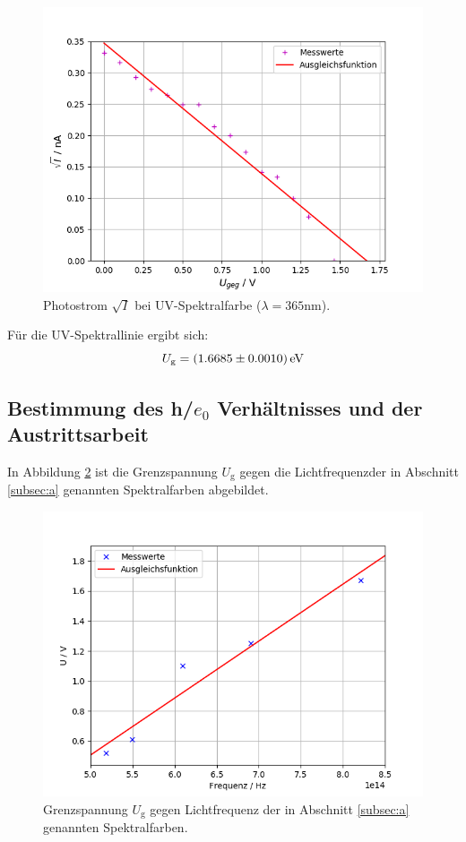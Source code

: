 \documentclass[
  bibliography=totoc,     %
  captions=tableheading,  %
  titlepage=firstiscover, %
]{scrartcl}
\begin{document}
\begin{figure}[H]
    \centering
    \includegraphics[scale=0.7]{Auswertung/aUv.png}
    \caption{Photostrom $\sqrt{I}$ bei UV-Spektralfarbe ($\lambda = 365 \text{nm}$).}
    \label{fig:UV}
\end{figure}
Für die UV-Spektrallinie ergibt sich:
\begin{equation*}
	U_\text{g} = \SI{1.6685 \pm 0.0010}{\eV}
\end{equation*}

\subsection{Bestimmung des h/$e_0$ Verhältnisses und der Austrittsarbeit}
In Abbildung \ref{fig:bPlot} ist die Grenzspannung $U_\text{g}$ gegen die Lichtfrequenz\nu der in Abschnitt \ref{subsec:a} genannten Spektralfarben abgebildet.

\begin{figure}[H]
    \centering
    \includegraphics[scale=0.7]{Auswertung/bPlot.png}
    \caption{Grenzspannung $U_\text{g}$ gegen Lichtfrequenz \nu der in Abschnitt \ref{subsec:a} genannten Spektralfarben.}
    \label{fig:bPlot}
\end{figure}
\end{document}
